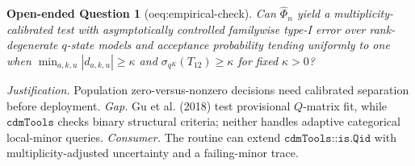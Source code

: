 \documentclass{article}
\newtheorem{openendedquestion}{Open-ended Question}
\begin{document}
\begin{openendedquestion}[oeq:empirical-check]\label{oeq:empirical-check}
Can \(\widehat\Phi_n\) yield a multiplicity-calibrated test with asymptotically controlled familywise type-I error over rank-degenerate \(q\)-state models and acceptance probability tending uniformly to one when \(\min_{a,k,u}|d_{a,k,u}|\ge\kappa\) and \(\sigma_{q^K}(T_{12})\ge\kappa\) for fixed \(\kappa>0\)?
\end{openendedquestion}
\par\smallskip\noindent \textit{Justification.} Population zero-versus-nonzero decisions need calibrated separation before deployment. \textit{Gap.} Gu et al. (2018) test provisional \(Q\)-matrix fit, while \(\texttt{cdmTools}\) checks binary structural criteria; neither handles adaptive categorical local-minor queries. \textit{Consumer.} The routine can extend \(\texttt{cdmTools::is.Qid}\) with multiplicity-adjusted uncertainty and a failing-minor trace.
\end{document}
